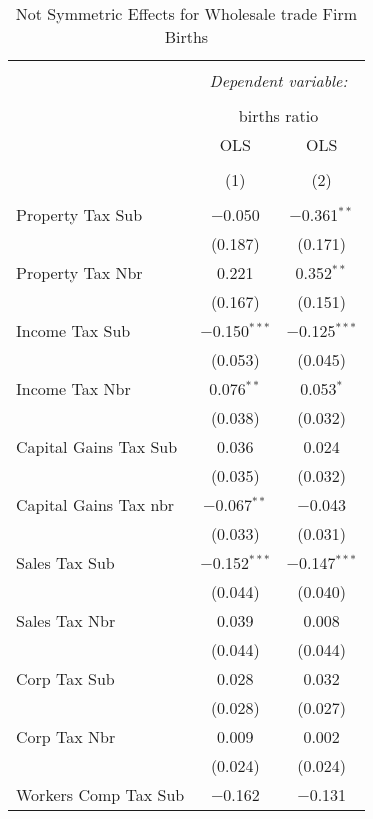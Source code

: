 
\begin{table}[!htbp] \centering 
  \caption{Not Symmetric Effects for  Wholesale trade Firm Births} 
  \label{42noequality} 
\footnotesize 
\begin{tabular}{@{\extracolsep{5pt}}lcc} 
\\[-1.8ex]\hline 
\hline \\[-1.8ex] 
 & \multicolumn{2}{c}{\textit{Dependent variable:}} \\ 
\cline{2-3} 
\\[-1.8ex] & \multicolumn{2}{c}{births ratio} \\ 
 & OLS & OLS \\ 
\\[-1.8ex] & (1) & (2)\\ 
\hline \\[-1.8ex] 
 Property Tax Sub & $-$0.050 & $-$0.361$^{**}$ \\ 
  & (0.187) & (0.171) \\ 
  Property Tax Nbr & 0.221 & 0.352$^{**}$ \\ 
  & (0.167) & (0.151) \\ 
  Income Tax Sub & $-$0.150$^{***}$ & $-$0.125$^{***}$ \\ 
  & (0.053) & (0.045) \\ 
  Income Tax Nbr & 0.076$^{**}$ & 0.053$^{*}$ \\ 
  & (0.038) & (0.032) \\ 
  Capital Gains Tax Sub & 0.036 & 0.024 \\ 
  & (0.035) & (0.032) \\ 
  Capital Gains Tax nbr & $-$0.067$^{**}$ & $-$0.043 \\ 
  & (0.033) & (0.031) \\ 
  Sales Tax Sub & $-$0.152$^{***}$ & $-$0.147$^{***}$ \\ 
  & (0.044) & (0.040) \\ 
  Sales Tax Nbr & 0.039 & 0.008 \\ 
  & (0.044) & (0.044) \\ 
  Corp Tax Sub & 0.028 & 0.032 \\ 
  & (0.028) & (0.027) \\ 
  Corp Tax Nbr & 0.009 & 0.002 \\ 
  & (0.024) & (0.024) \\ 
  Workers Comp Tax Sub & $-$0.162 & $-$0.131 \\ 

\end{tabular}
\end{table}
